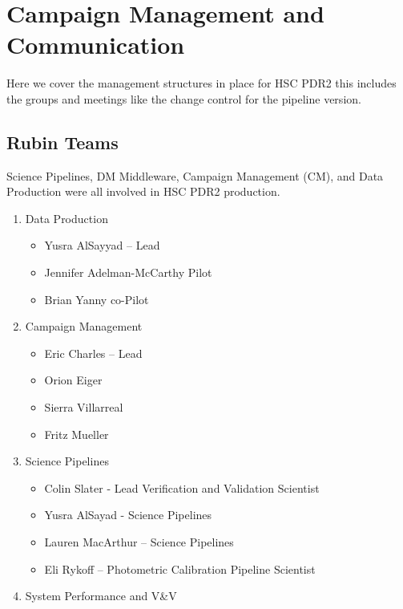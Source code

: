 \section{Campaign Management and Communication} \label{sec:management}

Here we cover the management structures in place for HSC PDR2 
this includes the groups and meetings like the change control for 
the pipeline version.

\subsection{Rubin Teams}

Science Pipelines, DM Middleware, Campaign Management (CM), and Data Production
were all involved in HSC PDR2 production.

\begin{enumerate}

\item Data Production


\begin{itemize}
\item Yusra AlSayyad -- Lead
\item Jennifer Adelman-McCarthy Pilot
\item Brian Yanny co-Pilot
\end{itemize}


\item Campaign Management

\begin{itemize}
\item Eric Charles -- Lead
\item Orion Eiger
\item Sierra Villarreal
\item Fritz Mueller
\end{itemize}

\item Science Pipelines

\begin{itemize}
\item Colin Slater - Lead Verification and Validation Scientist
\item Yusra AlSayad - Science Pipelines 
\item Lauren MacArthur -- Science Pipelines
\item Eli Rykoff -- Photometric Calibration Pipeline Scientist
\end{itemize}

\item System Performance and V\&V


\end{enumerate}
